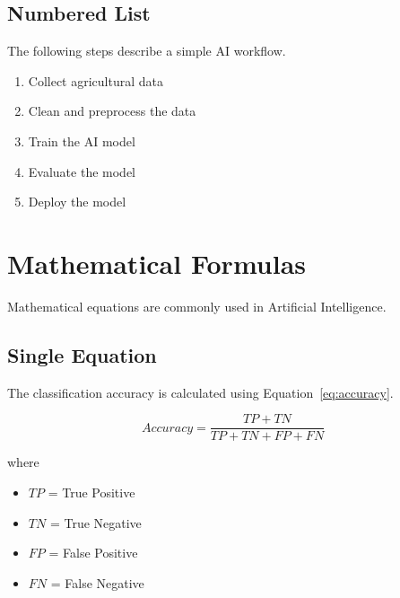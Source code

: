 \documentclass[pdflatex,sn-mathphys-num]{sn-jnl}%
\theoremstyle{thmstyleone}%
\theoremstyle{thmstyletwo}%
\theoremstyle{thmstylethree}%
\begin{document}
\subsection{Numbered List}

The following steps describe a simple AI workflow.

\begin{enumerate}

\item Collect agricultural data

\item Clean and preprocess the data

\item Train the AI model

\item Evaluate the model

\item Deploy the model

\end{enumerate}


\section{Mathematical Formulas}
\label{sec:formula}

Mathematical equations are commonly used in Artificial Intelligence.

\subsection{Single Equation}

The classification accuracy is calculated using Equation~\ref{eq:accuracy}.

\begin{equation}
Accuracy=\frac{TP+TN}{TP+TN+FP+FN}
\label{eq:accuracy}
\end{equation}

where

\begin{itemize}

\item $TP$ = True Positive

\item $TN$ = True Negative

\item $FP$ = False Positive

\item $FN$ = False Negative

\end{itemize}
\end{document}
